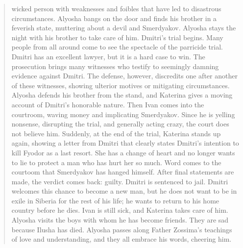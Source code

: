 \documentclass{article}
\begin{document}
\begin{quote}
wicked person with weaknesses and foibles that have led to disastrous circumstances. Alyosha bangs on the door and finds his brother in a feverish state, muttering about a devil and Smerdyakov. Alyosha stays the night with his brother to take care of him. Dmitri's trial begins. Many people from all around come to see the spectacle of the parricide trial. Dmitri has an excellent lawyer, but it is a hard case to win. The prosecution brings many witnesses who testify to seemingly damning evidence against Dmitri. The defense, however, discredits one after another of these witnesses, showing ulterior motives or mitigating circumstances. Alyosha defends his brother from the stand, and Katerina gives a moving account of Dmitri's honorable nature. Then Ivan comes into the courtroom, waving money and implicating Smerdyakov. Since he is yelling nonsense, disrupting the trial, and generally acting crazy, the court does not believe him. Suddenly, at the end of the trial, Katerina stands up again, showing a letter from Dmitri that clearly states Dmitri's intention to kill Fyodor as a last resort. She has a change of heart and no longer wants to lie to protect a man who has hurt her so much. Word comes to the courtoom that Smerdyakov has hanged himself. After final statements are made, the verdict comes back: guilty. Dmitri is sentenced to jail. Dmitri welcomes this chance to become a new man, but he does not want to be in exile in Siberia for the rest of his life; he wants to return to his home country before he dies. Ivan is still sick, and Katerina takes care of him. Alyosha visits the boys with whom he has become friends. They are sad because Ilusha has died. Alyosha passes along Father Zossima's teachings of love and understanding, and they all embrace his words, cheering him.

\end{quote}
\end{document}
